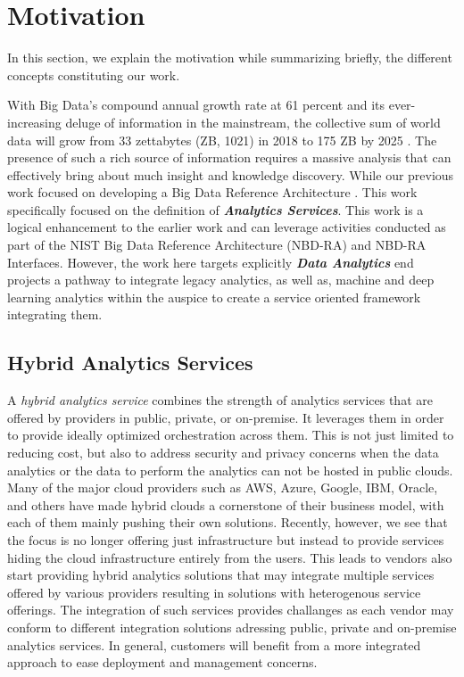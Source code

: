 


\section{Motivation}\label{s:background}

In this section, we explain the motivation  while summarizing
briefly, the different concepts constituting our work.

With Big Data's compound annual growth rate at 61 percent and its
ever-increasing deluge of information in the mainstream, the
collective sum of world data will grow from 33 zettabytes (ZB, 1021)
in 2018 to 175 ZB by 2025 . The presence of such a rich source of
information requires a massive analysis that can effectively bring
about much insight and knowledge discovery. While our previous work
focused on developing a Big Data Reference
Architecture \cite{??}. This work specifically focused on the
definition of {\bf\em Analytics Services}.  This work is a logical
enhancement to the earlier work and can leverage activities conducted
as part of the NIST Big Data Reference Architecture (NBD-RA) and
NBD-RA Interfaces.  However, the work here targets explicitly {\bf\em
Data Analytics} end projects a pathway to integrate legacy analytics,
as well as, machine and deep learning analytics within the auspice to
create a service oriented framework integrating them.



\subsection{Hybrid Analytics Services}

A {\em hybrid analytics service} combines the strength of analytics
services that are offered by providers in public, private, or
on-premise. It leverages them in order to provide ideally optimized
orchestration across them. This is not just limited to reducing cost,
but also to address security and privacy concerns when the data
analytics or the data to perform the analytics can not be hosted in
public clouds. Many of the major cloud providers such as AWS, Azure,
Google, IBM, Oracle, and others have made hybrid clouds a cornerstone
of their business model, with each of them mainly pushing their own
solutions. Recently, however, we see that the focus is no longer
offering just infrastructure but instead to provide services hiding the
cloud infrastructure entirely from the users.  This leads to vendors
also start providing hybrid analytics solutions that may integrate
multiple services offered by various providers resulting in solutions
with heterogenous service offerings. The integration of such services
provides challanges as each vendor may conform to different
integration solutions adressing public, private and on-premise
analytics services. In general, customers will benefit from a more
integrated approach to ease deployment and management concerns.

